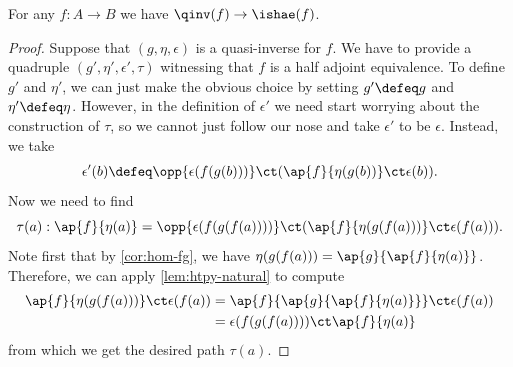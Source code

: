 %
\begin{thm}\label{thm:equiv-iso-adj}
  For any $f:A\to B$ we have $\qinv(f)\to\ishae(f)$.
\end{thm}

\begin{proof}
Suppose that $(g,\eta,\epsilon)$ is a quasi-inverse for $f$. We have to provide
a quadruple $(g',\eta',\epsilon',\tau)$ witnessing that $f$ is a half adjoint equivalence. To
define $g'$ and $\eta'$, we can just make the obvious choice by setting $g'
\defeq g$ and $\eta'\defeq \eta$. However, in the definition of $\epsilon'$ we
need start worrying about the construction of $\tau$, so we cannot just follow our nose
and take $\epsilon'$ to be $\epsilon$. Instead, we take
\begin{equation*}
\epsilon'(b) \defeq \opp{\epsilon(f(g(b)))}\ct (\ap{f}{\eta(g(b))}\ct \epsilon(b)).
\end{equation*}
Now we need to find
\begin{equation*}
\tau(a): \ap{f}{\eta(a)}=\opp{\epsilon(f(g(f(a))))}\ct (\ap{f}{\eta(g(f(a)))}\ct \epsilon(f(a))).
\end{equation*}
Note first that by \cref{cor:hom-fg}, we have
$\eta(g(f(a)))=\ap{g}{\ap{f}{\eta(a)}}$. Therefore, we can apply
\cref{lem:htpy-natural} to compute
\begin{align*}
\ap{f}{\eta(g(f(a)))}\ct \epsilon(f(a))
& = \ap{f}{\ap{g}{\ap{f}{\eta(a)}}}\ct \epsilon(f(a))\\
& = \epsilon(f(g(f(a))))\ct \ap{f}{\eta(a)}
\end{align*}
from which we get the desired path $\tau(a)$.
\end{proof}
